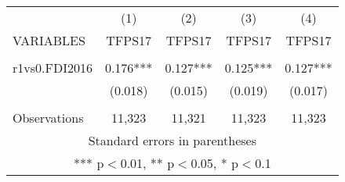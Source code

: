 \documentclass[]{article}
\begin{document}
\begin{tabular}{lcccc} \hline
 & (1) & (2) & (3) & (4) \\
VARIABLES & TFPS17 & TFPS17 & TFPS17 & TFPS17 \\ \hline
 &  &  &  &  \\
r1vs0.FDI2016 & 0.176*** & 0.127*** & 0.125*** & 0.127*** \\
 & (0.018) & (0.015) & (0.019) & (0.017) \\
 &  &  &  &  \\
 Observations & 11,323 & 11,321 & 11,323 & 11,323 \\ \hline
\multicolumn{5}{c}{ Standard errors in parentheses} \\
\multicolumn{5}{c}{ *** p$<$0.01, ** p$<$0.05, * p$<$0.1} \\
\end{tabular}
\end{document}
